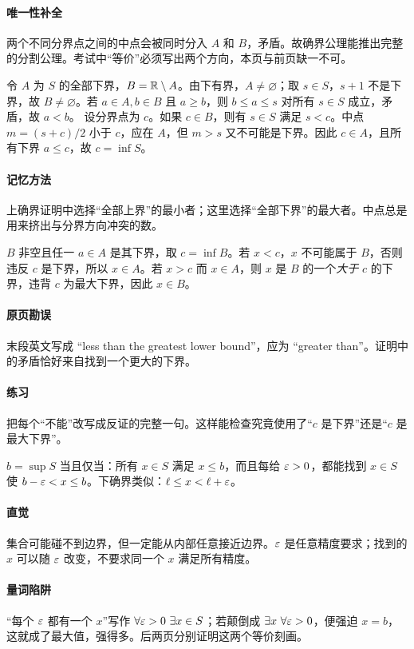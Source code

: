 \paragraph{唯一性补全}两个不同分界点之间的中点会被同时分入 $A$ 和 $B$，矛盾。故确界公理能推出完整的分割公理。考试中“等价”必须写出两个方向，本页与前页缺一不可。

令 $A$ 为 $S$ 的全部下界，$B=\mathbb{R}\setminus A$。由下有界，$A\ne\varnothing$；取 $s\in S$，$s+1$ 不是下界，故 $B\ne\varnothing$。若 $a\in A,b\in B$ 且 $a\ge b$，则 $b\le a\le s$ 对所有 $s\in S$ 成立，矛盾，故 $a<b$。
设分界点为 $c$。如果 $c\in B$，则有 $s\in S$ 满足 $s<c$。中点 $m=(s+c)/2$ 小于 $c$，应在 $A$，但 $m>s$ 又不可能是下界。因此 $c\in A$，且所有下界 $a\le c$，故 $c=\inf S$。
\paragraph{记忆方法}上确界证明中选择“全部上界”的最小者；这里选择“全部下界”的最大者。中点总是用来挤出与分界方向冲突的数。

$B$ 非空且任一 $a\in A$ 是其下界，取 $c=\inf B$。若 $x<c$，$x$ 不可能属于 $B$，否则违反 $c$ 是下界，所以 $x\in A$。若 $x>c$ 而 $x\in A$，则 $x$ 是 $B$ 的一个\emph{大于} $c$ 的下界，违背 $c$ 为最大下界，因此 $x\in B$。
\paragraph{原页勘误}末段英文写成 ``less than the greatest lower bound''，应为 ``greater than''。证明中的矛盾恰好来自找到一个更大的下界。
\paragraph{练习}把每个“不能”改写成反证的完整一句。这样能检查究竟使用了“$c$ 是下界”还是“$c$ 是最大下界”。

$b=\sup S$ 当且仅当：所有 $x\in S$ 满足 $x\le b$，而且每给 $\varepsilon>0$，都能找到 $x\in S$ 使 $b-\varepsilon<x\le b$。下确界类似：$\ell\le x<\ell+\varepsilon$。
\paragraph{直觉}集合可能碰不到边界，但一定能从内部任意接近边界。$\varepsilon$ 是任意精度要求；找到的 $x$ 可以随 $\varepsilon$ 改变，不要求同一个 $x$ 满足所有精度。
\paragraph{量词陷阱}“每个 $\varepsilon$ 都有一个 $x$”写作 $\forall\varepsilon>0\ \exists x\in S$；若颠倒成 $\exists x\ \forall\eps>0$，便强迫 $x=b$，这就成了最大值，强得多。后两页分别证明这两个等价刻画。

